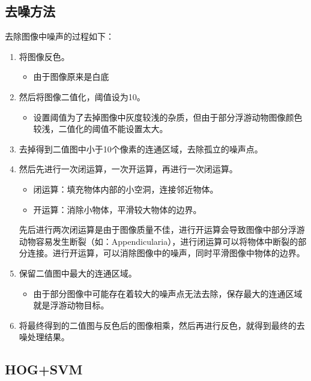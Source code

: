 \documentclass[12pt]{article}
\begin{document}
\subsection{去噪方法}
    去除图像中噪声的过程如下：
    \begin{enumerate}
        \item 将图像反色。
        \begin{itemize}
            \item 由于图像原来是白底
        \end{itemize}
        \item 然后将图像二值化，阈值设为10。
        \begin{itemize}
            \item 设置阈值为了去掉图像中灰度较浅的杂质，但由于部分浮游动物图像颜色较浅，二值化的阈值不能设置太大。
        \end{itemize}
        \item 去掉得到二值图中小于10个像素的连通区域，去除孤立的噪声点。
        \item 然后先进行一次闭运算，一次开运算，再进行一次闭运算。
        \begin{itemize}
            \item 闭运算：填充物体内部的小空洞，连接邻近物体。
            \item 开运算：消除小物体，平滑较大物体的边界。
        \end{itemize}
        先后进行两次闭运算是由于图像质量不佳，进行开运算会导致图像中部分浮游动物容易发生断裂（如：Appendicularia），进行闭运算可以将物体中断裂的部分连接。进行开运算，可以消除图像中的噪声，同时平滑图像中物体的边界。
        \item 保留二值图中最大的连通区域。
        \begin{itemize}
            \item 由于部分图像中可能存在着较大的噪声点无法去除，保存最大的连通区域就是浮游动物目标。
        \end{itemize}
        \item 将最终得到的二值图与反色后的图像相乘，然后再进行反色，就得到最终的去噪处理结果。
    \end{enumerate}        

\subsection{HOG+SVM}
\end{document}
